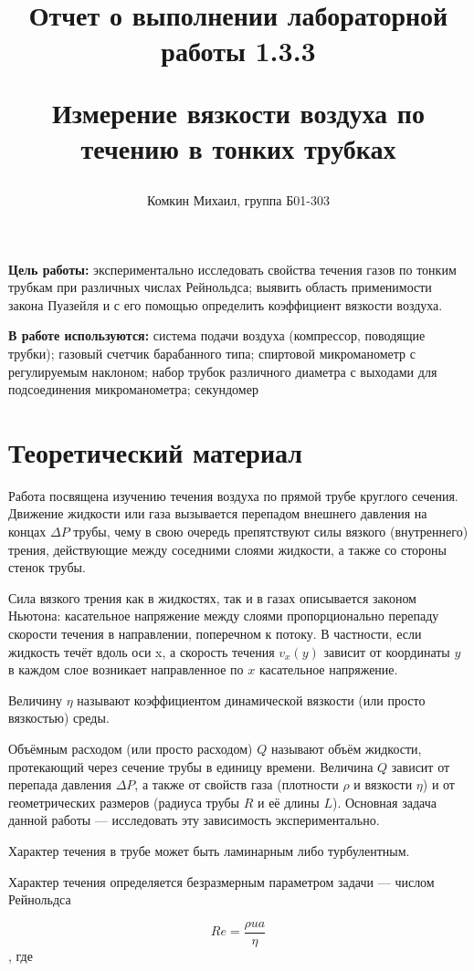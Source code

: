 \documentclass[12pt,a4paper]{article}
\title{
Отчет о выполнении лабораторной работы 1.3.3

Измерение вязкости воздуха по течению
в тонких трубках
}
\author{Комкин Михаил, группа Б01-303}
\begin{document}
\maketitle
\newpage

\textbf{Цель работы:} экспериментально исследовать свойства течения газов по тонким трубкам при различных числах Рейнольдса; выявить область применимости закона Пуазейля и с его помощью определить коэффициент вязкости воздуха.

\textbf{В работе используются:} система подачи воздуха (компрессор, поводящие трубки); газовый счетчик барабанного типа; спиртовой микроманометр с регулируемым наклоном; набор трубок различного диаметра с выходами для подсоединения микроманометра; секундомер

\section{Теоретический материал}

Работа посвящена изучению течения воздуха по прямой трубе круглого сечения. Движение жидкости или газа вызывается перепадом внешнего давления на концах $\Delta P$ трубы, чему в свою очередь препятствуют силы вязкого (внутреннего) трения, действующие между соседними слоями жидкости, а также со стороны стенок трубы.

Сила вязкого трения как в жидкостях, так и в газах описывается законом
Ньютона: касательное напряжение между слоями пропорционально перепаду
скорости течения в направлении, поперечном к потоку. В частности, если жидкость течёт вдоль оси x,  а скорость течения $v_{x}(y)$ зависит от координаты $y$  в каждом слое возникает направленное по $x$ касательное напряжение.

Величину $\eta$ называют коэффициентом динамической вязкости (или просто вязкостью) среды.

Объёмным расходом (или просто расходом) $Q$ называют объём жидкости,
протекающий через сечение трубы в единицу времени. Величина $Q$ зависит от
перепада давления $\Delta P$, а также от свойств газа (плотности $\rho$ и вязкости $\eta$) и от
геометрических размеров (радиуса трубы $R$ и её длины $L$). Основная задача
данной работы — исследовать эту зависимость экспериментально.

Характер течения в трубе может быть ламинарным либо турбулентным. 

Характер течения определяется безразмерным параметром задачи — числом Рейнольдса

$$ Re = \frac{\rho u a}{\eta}$$, где
\end{document}

